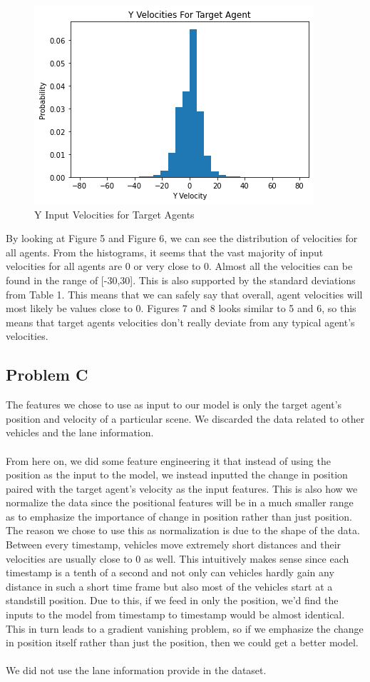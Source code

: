 \documentclass{article}
\begin{document}
\begin{figure}[H]
    \centering
    \includegraphics[scale=.5]{v_target_y.png}
    \caption{Y Input Velocities for Target Agents}
    \label{fig:galaxy}
\end{figure}

By looking at Figure 5 and Figure 6, we can see the distribution of velocities for all agents. From the histograms, it seems that the vast majority of input velocities for all agents are 0 or very close to 0. Almost all the velocities can be found in the range of [-30,30]. This is also supported by the standard deviations from Table 1.  This means that we can safely say that overall, agent velocities will most likely be values close to 0. Figures 7 and 8 looks similar to 5 and 6, so this means that target agents velocities don't really deviate from any typical agent's velocities. 

\subsection{Problem C}
The features we chose to use as input to our model is only the target agent's position and velocity of a particular scene. We discarded the data related to other vehicles and the lane information. \\ \\
From here on, we did some feature engineering it that instead of using the position as the input to the model, we instead inputted the change in position paired with the target agent's velocity as the input features. This is also how we normalize the data since the positional features will be in a much smaller range as to emphasize the importance of change in position rather than just position. The reason we chose to use this as normalization is due to the shape of the data. Between every timestamp, vehicles move extremely short distances and their velocities are usually close to 0 as well. This intuitively makes sense since each timestamp is a tenth of a second and not only can vehicles hardly gain any distance in such a short time frame but also most of the vehicles start at a standstill position. Due to this, if we feed in only the position, we'd find the inputs to the model from timestamp to timestamp would be almost identical. This in turn leads to a gradient vanishing problem, so if we emphasize the change in position itself rather than just the position, then we could get a better model. \\ \\
We did not use the lane information provide in the dataset.
\end{document}

